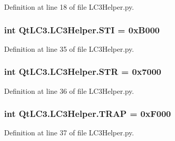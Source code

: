 Definition at line 18 of file L\-C3\-Helper.\-py.

\hypertarget{namespace_qt_l_c3_1_1_l_c3_helper_a98e7ada71d9f15520c276fa797e1343f}{
\subsubsection[{S\-T\-I}]{\setlength{\rightskip}{0pt plus 5cm}int Qt\-L\-C3.\-L\-C3\-Helper.\-S\-T\-I = 0x\-B000}}\label{namespace_qt_l_c3_1_1_l_c3_helper_a98e7ada71d9f15520c276fa797e1343f}


Definition at line 35 of file L\-C3\-Helper.\-py.

\hypertarget{namespace_qt_l_c3_1_1_l_c3_helper_a64d7a91288d9d2de515dd63e71c0c25a}{
\subsubsection[{S\-T\-R}]{\setlength{\rightskip}{0pt plus 5cm}int Qt\-L\-C3.\-L\-C3\-Helper.\-S\-T\-R = 0x7000}}\label{namespace_qt_l_c3_1_1_l_c3_helper_a64d7a91288d9d2de515dd63e71c0c25a}


Definition at line 36 of file L\-C3\-Helper.\-py.

\hypertarget{namespace_qt_l_c3_1_1_l_c3_helper_ad70fb630058318d34edec66d1e3e4b6e}{
\subsubsection[{T\-R\-A\-P}]{\setlength{\rightskip}{0pt plus 5cm}int Qt\-L\-C3.\-L\-C3\-Helper.\-T\-R\-A\-P = 0x\-F000}}\label{namespace_qt_l_c3_1_1_l_c3_helper_ad70fb630058318d34edec66d1e3e4b6e}


Definition at line 37 of file L\-C3\-Helper.\-py.


